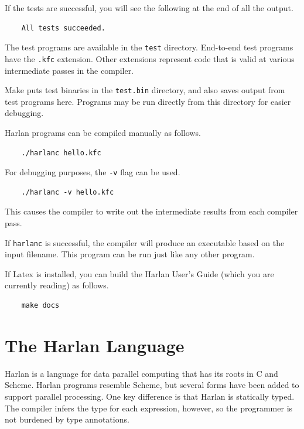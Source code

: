 \documentclass[oneside]{report}
\begin{document}
If the tests are successful, you will see the following at the end of
all the output.

\begin{verbatim}
    All tests succeeded.
\end{verbatim}

The test programs are available in the \texttt{test}
directory. End-to-end test programs have the \texttt{.kfc}
extension. Other extensions represent code that is valid at various
intermediate passes in the compiler.

Make puts test binaries in the \texttt{test.bin} directory, and also
saves output from test programs here. Programs may be run directly
from this directory for easier debugging.

Harlan programs can be compiled manually as follows.

\begin{verbatim}
    ./harlanc hello.kfc
\end{verbatim}

For debugging purposes, the \texttt{-v} flag can be used.

\begin{verbatim}
    ./harlanc -v hello.kfc
\end{verbatim}

This causes the compiler to write out the intermediate results from
each compiler pass.

If \texttt{harlanc} is successful, the compiler will produce an
executable based on the input filename. This program can be run just
like any other program.

If Latex is installed, you can build the Harlan User's Guide (which
you are currently reading) as follows.

\begin{verbatim}
    make docs
\end{verbatim}



\chapter{The Harlan Language}

Harlan is a language for data parallel computing that has its roots in
C and Scheme. Harlan programs resemble Scheme, but several forms have
been added to support parallel processing. One key difference is that
Harlan is statically typed. The compiler infers the type for each
expression, however, so the programmer is not burdened by type
annotations.
\end{document}
